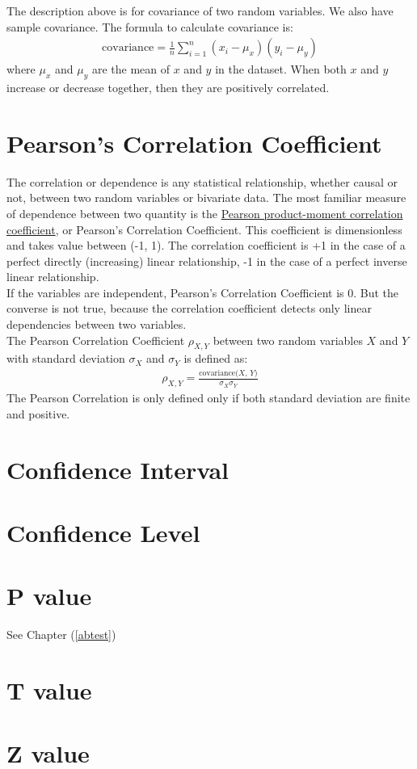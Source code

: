 The description above is for covariance of two random variables. We also have sample covariance. The formula to calculate covariance is:\\
\begin{eqnarray}
\text{covariance} = \frac{1}{n} \sum^{n}_{i =1} (x_i - \mu_x)(y_i - \mu_y)
\label{covariance}
\end{eqnarray}
where $\mu_x$ and $\mu_y$ are the mean of $x$ and $y$ in the dataset. When both $x$ and $y$ increase or decrease together, then they are positively correlated.

\section{Pearson's Correlation Coefficient}

The correlation or dependence is any statistical relationship, whether causal or not, between two random variables or bivariate data. The most familiar measure of dependence between two quantity is the \underline{Pearson product-moment correlation coefficient}, or Pearson's Correlation Coefficient. This coefficient is dimensionless and takes value between (-1, 1). The correlation coefficient is +1 in the case of a perfect directly (increasing) linear relationship, -1 in the case of a perfect inverse linear relationship. \\

If the variables are independent, Pearson's Correlation Coefficient is 0. But the converse is not true, because the correlation coefficient detects only linear dependencies between two variables.\\

The Pearson Correlation Coefficient $\rho_{X,Y}$ between two random variables $X$ and $Y$ with standard deviation $\sigma_X$ and $\sigma_Y$ is defined as:
\begin{eqnarray}
\rho_{X,Y} = \frac{\text{covariance($X$, $Y$)}}{\sigma_X \sigma_Y}
\label{pearson}
\end{eqnarray}
The Pearson Correlation is only defined only if both standard deviation are finite and positive. 


\section{Confidence Interval}

\section{Confidence Level}

\section{P value}

See Chapter (\ref{abtest})

\section{T value}

\section{Z value}




